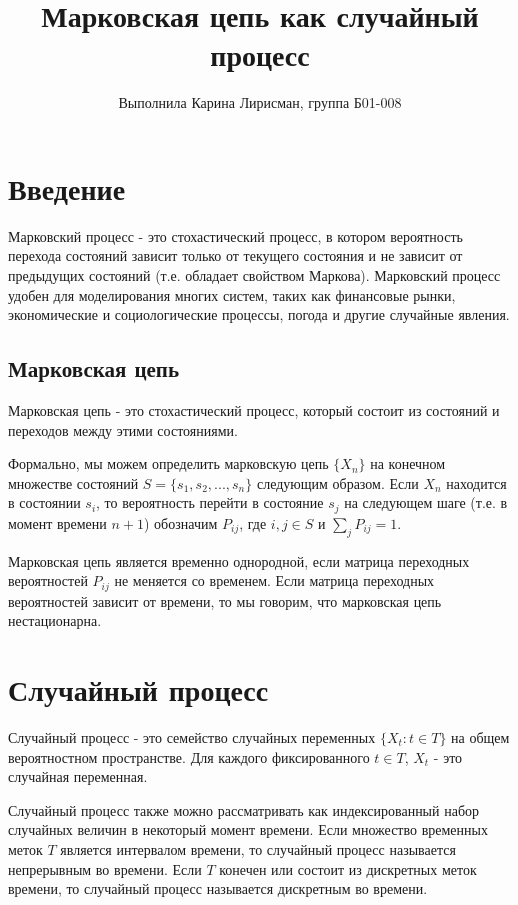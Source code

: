 \documentclass[12pt]{article}
\begin{document}
\title{\textbf{Марковская цепь как случайный процесс}}
\author{Выполнила Карина Лирисман, группа Б01-008}
\date{}

\maketitle

\section{Введение}

Марковский процесс - это стохастический процесс, в котором вероятность перехода состояний зависит только от текущего состояния и не зависит от предыдущих состояний (т.е. обладает свойством Маркова). Марковский процесс удобен для моделирования многих систем, таких как финансовые рынки, экономические и социологические процессы, погода и другие случайные явления.

\subsection{Марковская цепь}

Марковская цепь - это стохастический процесс, который состоит из состояний и переходов между этими состояниями. 

Формально, мы можем определить марковскую цепь $\{X_n\}$ на конечном множестве состояний $S = \{s_1, s_2, ..., s_n\}$ следующим образом. Если $X_n$ находится в состоянии $s_i$, то вероятность перейти в состояние $s_j$ на следующем шаге (т.е. в момент времени $n+1$) обозначим $P_{ij}$, где $i,j \in S$ и $\sum_{j}P_{ij}=1$.

Марковская цепь является временно однородной, если матрица переходных вероятностей $P_{ij}$ не меняется со временем. Если матрица переходных вероятностей зависит от времени, то мы говорим, что марковская цепь нестационарна.

\section{Случайный процесс}

Случайный процесс - это семейство случайных переменных $\{X_t : t \in T\}$ на общем вероятностном пространстве. Для каждого фиксированного $t \in T$, $X_t$ - это случайная переменная. 

Случайный процесс также можно рассматривать как индексированный набор случайных величин в некоторый момент времени. Если множество временных меток $T$ является интервалом времени, то случайный процесс называется непрерывным во времени. Если $T$ конечен или состоит из дискретных меток времени, то случайный процесс называется дискретным во времени.
\end{document}
